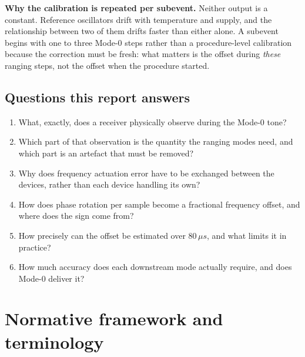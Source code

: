 \documentclass[11pt,a4paper]{article}
\newcommand{\us}{\,\ensuremath{\upmu}s}
\providecommand{\upmu}{\mu}
\begin{document}
\begin{callout}
\textbf{Why the calibration is repeated per subevent.} Neither output is a constant. Reference
oscillators drift with temperature and supply, and the relationship between two of them drifts
faster than either alone. A subevent begins with one to three Mode-0 steps rather than a
procedure-level calibration because the correction must be fresh: what matters is the offset during
\emph{these} ranging steps, not the offset when the procedure started.
\end{callout}

\subsection{Questions this report answers}

\begin{enumerate}[leftmargin=1.6em,itemsep=1pt]
  \item What, exactly, does a receiver physically observe during the Mode-0 tone?
  \item Which part of that observation is the quantity the ranging modes need, and which part is an
        artefact that must be removed?
  \item Why does frequency actuation error have to be exchanged between the devices, rather than
        each device handling its own?
  \item How does phase rotation per sample become a fractional frequency offset, and where does the
        sign come from?
  \item How precisely can the offset be estimated over $80\us$, and what limits it in practice?
  \item How much accuracy does each downstream mode actually require, and does Mode-0 deliver it?
\end{enumerate}
\section{Normative framework and terminology}
\end{document}
